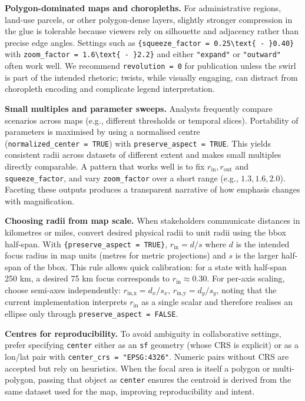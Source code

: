\textbf{Polygon-dominated maps and choropleths.} For administrative regions, land-use parcels, or other
polygon-dense layers, slightly stronger compression in the glue is tolerable because viewers rely on
silhouette and adjacency rather than precise edge angles. Settings such as \texttt{\{squeeze\_factor\ =\ 0.25\textbackslash{}text\{\ -\ \}0.40\}} with \texttt{zoom\_factor\ =\ 1.6\textbackslash{}text\{\ -\ \}2.2\}} and either \texttt{"expand"} or
\texttt{"outward"} often work well. We recommend \texttt{revolution\ =\ 0} for publication unless the swirl
is part of the intended rhetoric; twists, while visually engaging, can distract from choropleth
encoding and complicate legend interpretation.

\textbf{Small multiples and parameter sweeps.} Analysts frequently compare scenarios across maps (e.g.,
different thresholds or temporal slices). Portability of parameters is maximised by using a
normalised centre (\texttt{normalized\_center\ =\ TRUE}) with \texttt{preserve\_aspect\ =\ TRUE}. This yields
consistent radii across datasets of different extent and makes small multiples directly comparable. A
pattern that works well is to fix \(r_{\text{in}}, r_{\text{out}}\) and \texttt{squeeze\_factor}, and vary
\texttt{zoom\_factor} over a short range (e.g., \(1.3, 1.6, 2.0\)). Faceting these outputs produces a
transparent narrative of how emphasis changes with magnification.

\textbf{Choosing radii from map scale.} When stakeholders communicate distances in kilometres or miles,
convert desired physical radii to unit radii using the bbox half-span. With \texttt{\{preserve\_aspect\ =\ TRUE\}}, \(r_{\text{in}} = d/s\) where \(d\) is the intended focus radius in map units (metres for
metric projections) and \(s\) is the larger half-span of the bbox. This rule allows quick calibration:
for a state with half-span 250 km, a desired 75 km focus corresponds to \(r_{\text{in}} \approx 0.30\).
For per-axis scaling, choose semi-axes independently: \(r_{\text{in,x}} = d_x/s_x\),
\(r_{\text{in,y}} = d_y/s_y\), noting that the current implementation interprets \(r_{\text{in}}\) as a
single scalar and therefore realises an ellipse only through \texttt{preserve\_aspect\ =\ FALSE}.

\textbf{Centres for reproducibility.} To avoid ambiguity in collaborative settings, prefer specifying
\texttt{center} either as an \texttt{sf} geometry (whose CRS is explicit) or as a lon/lat pair with
\texttt{center\_crs\ =\ "EPSG:4326"}. Numeric pairs without CRS are accepted but rely on heuristics. When
the focal area is itself a polygon or multi-polygon, passing that object as \texttt{center} ensures the
centroid is derived from the same dataset used for the map, improving reproducibility and intent.

